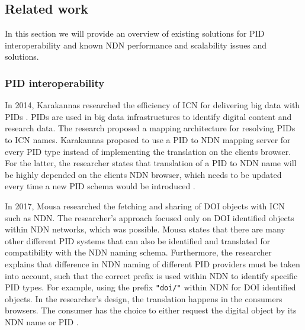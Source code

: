 \subsection{Related work}
\label{introduction-related-work}


In this section we will provide an overview of existing solutions for PID interoperability and known NDN performance and scalability issues and solutions.

\subsubsection{PID interoperability}
\label{introduction-pid}
In 2014, Karakannas researched the efficiency of ICN for delivering big data with PIDs \cite{icn-bd}. PIDs are used in big data infrastructures to identify digital content and research data. The research proposed a mapping architecture for resolving PIDs to ICN names. Karakannas proposed to use a PID to NDN mapping server for every PID type instead of implementing the translation on the clients browser. For the latter, the researcher states that translation of a PID to NDN name will be highly depended on the clients NDN browser, which needs to be updated every time a new PID schema would be introduced \cite{icn-bd}.

In 2017, Mousa researched the fetching and sharing of DOI objects with ICN such as NDN. 
The researcher's approach focused only on DOI identified objects within NDN networks, which was possible. Mousa states that there are many other different PID systems that can also be identified and translated for compatibility with the NDN naming schema. Furthermore, the researcher explains that difference in NDN naming of different PID providers must be taken into account, such that the correct prefix is used within NDN to identify specific PID types. For example, using the prefix \texttt{"doi/"} within NDN for DOI identified objects.
In the researcher's design, the translation happens in the consumers browsers. The consumer has the choice to either request the digital object by its NDN name or PID \cite{ndn-app-aware}.

